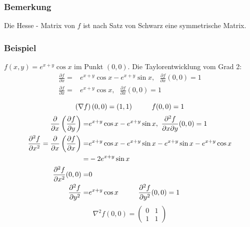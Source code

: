 \subsubsection*{Bemerkung}
Die Hesse - Matrix von $f$ ist nach Satz von Schwarz eine symmetrische Matrix.

\subsubsection*{Beispiel}
$f\left( x,y\right)=e^{x+y}\cos x$ im Punkt $(0,0)$. Die Taylorentwicklung vom Grad 2:
\begin{align*}
\frac{{\partial f}}{{\partial x}} = & {e^{x + y}}\cos x - {e^{x + y}}\sin x,\text{ }\frac{{\partial f}}{{\partial x}}(0,0) = 1\\
\frac{{\partial f}}{{\partial x}} =  & {e^{x + y}}\cos x ,\text{ }\frac{{\partial f}}{{\partial x}}(0,0) = 1\\
\end{align*}
\[\left( \nabla f\right)(0,0)=(1,1)\hspace{10mm}f(0,0)=1\]
\begin{align*}
\frac{\partial }{{\partial x}}\left( {\frac{{\partial f}}{{\partial y}}} \right) = & {e^{x + y}}\cos x - {e^{x + y}}\sin x,\text{ }\frac{{{\partial ^2}f}}{{\partial x\partial y}}(0,0) = 1\\
\frac{{\partial^2 f}}{{\partial x^2}} = \frac{\partial }{{\partial x}}\left( {\frac{{\partial f}}{{\partial x}}} \right) = & {e^{x + y}}\cos x - {e^{x + y}}\sin x - {e^{x + y}}\sin x - {e^{x + y}}\cos x\\
= & -2e^{x+y}\sin x\\
\frac{{{\partial ^2}f}}{{\partial {x^2}}}(0,0) = & 0\\
\frac{{{\partial ^2}f}}{{\partial {y^2}}} = & {e^{x + y}}\cos x\hspace{10mm}\frac{{{\partial ^2}f}}{{\partial {y^2}}}(0,0) = 1
\end{align*}
\[{\nabla ^2}f(0,0) = \left( {\begin{array}{*{20}{c}}
0&1\\
1&1
\end{array}} \right)\]

